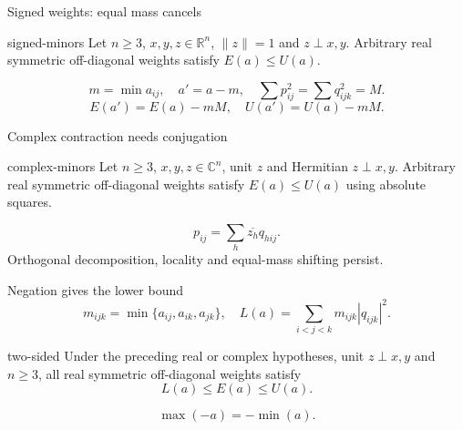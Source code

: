 \documentclass{beamer}
\begin{document}
\begin{frame}{Signed weights: equal mass cancels}
\begin{bookresult}{signed-minors}
Let $n\ge3$, $x,y,z\in\mathbb R^n$, $\|z\|=1$ and $z\perp x,y$. Arbitrary real symmetric off-diagonal weights satisfy $E(a)\le U(a)$.
\end{bookresult}
\[
m=\min a_{ij},\quad a'=a-m,\quad
\sum p_{ij}^2=\sum q_{ijk}^2=M.
\]
\[
E(a')=E(a)-mM,\quad U(a')=U(a)-mM.
\]
\end{frame}
\begin{frame}{Complex contraction needs conjugation}
\begin{bookresult}{complex-minors}
Let $n\ge3$, $x,y,z\in\mathbb C^n$, unit $z$ and Hermitian $z\perp x,y$. Arbitrary real symmetric off-diagonal weights satisfy $E(a)\le U(a)$ using absolute squares.
\end{bookresult}
\[
p_{ij}=\sum_h\overline{z_h}q_{hij}.
\]
\small Orthogonal decomposition, locality and equal-mass shifting persist.
\end{frame}
\begin{frame}{Negation gives the lower bound}
\[
m_{ijk}=\min\{a_{ij},a_{ik},a_{jk}\},
\quad L(a)=\sum_{i<j<k}m_{ijk}|q_{ijk}|^2.
\]
\begin{bookresult}{two-sided}
Under the preceding real or complex hypotheses, unit $z\perp x,y$ and $n\ge3$, all real symmetric off-diagonal weights satisfy
\[
L(a)\le E(a)\le U(a).
\]
\end{bookresult}
\[
\max(-a)=-\min(a).
\]
\end{frame}
\end{document}
